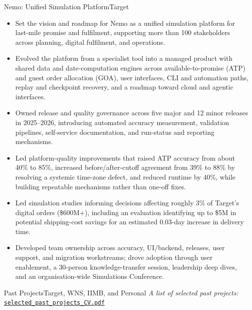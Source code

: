 \documentclass[11pt,a4paper]{moderncv}
\begin{document}
    {Nemo: Unified Simulation Platform}{Target}{}{}{
    \begin{itemize}
        \item Set the vision and roadmap for Nemo as a unified simulation platform for last-mile promise and fulfilment, supporting more than 100 stakeholders across planning, digital fulfilment, and operations.
        \item Evolved the platform from a specialist tool into a managed product with shared data and date-computation engines across available-to-promise (ATP) and guest order allocation (GOA), user interfaces, CLI and automation paths, replay and checkpoint recovery, and a roadmap toward cloud and agentic interfaces.
        \item Owned release and quality governance across five major and 12 minor releases in 2025--2026, introducing automated accuracy measurement, validation pipelines, self-service documentation, and run-status and reporting mechanisms.
        \item Led platform-quality improvements that raised ATP accuracy from about 40\% to 85\%, increased before/after-cutoff agreement from 39\% to 88\% by resolving a systemic time-zone defect, and reduced runtime by 40\%, while building repeatable mechanisms rather than one-off fixes.
        \item Led simulation studies informing decisions affecting roughly 3\% of Target's digital orders (\$600M+), including an evaluation identifying up to \$5M in potential shipping-cost savings for an estimated 0.03-day increase in delivery time.
        \item Developed team ownership across accuracy, UI/backend, releases, user support, and migration workstreams; drove adoption through user enablement, a 30-person knowledge-transfer session, leadership deep dives, and an organisation-wide Simulations Conference.
    \end{itemize}
    }

    {Past Projects}{Target, WNS, IIMB, and Personal}{}{}{
    \noindent \textit{A list of selected past projects:}
    \href{https://github.com/nik141088/CV/blob/main/selected_past_projects_CV.pdf}{\texttt{selected\_past\_projects\_CV.pdf}}
    }

\end{document}
